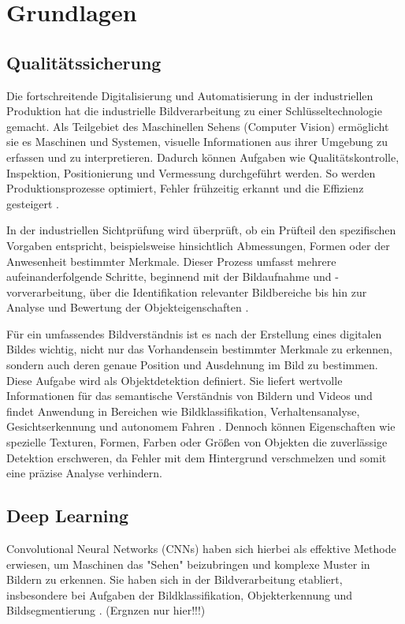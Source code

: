 \section{Grundlagen}

\subsection{Qualitätssicherung}
Die fortschreitende Digitalisierung und Automatisierung in der industriellen Produktion hat die industrielle Bildverarbeitung zu einer Schlüsseltechnologie gemacht. Als Teilgebiet des Maschinellen Sehens (Computer Vision) ermöglicht sie es Maschinen und Systemen, visuelle Informationen aus ihrer Umgebung zu erfassen und zu interpretieren. Dadurch können Aufgaben wie Qualitätskontrolle, Inspektion, Positionierung und Vermessung durchgeführt werden. So werden Produktionsprozesse optimiert, Fehler frühzeitig erkannt und die Effizienz gesteigert \cite{cognex_grundlagen_nodate}.

In der industriellen Sichtprüfung wird überprüft, ob ein Prüfteil den spezifischen Vorgaben entspricht, beispielsweise hinsichtlich Abmessungen, Formen oder der Anwesenheit bestimmter Merkmale. Dieser Prozess umfasst mehrere aufeinanderfolgende Schritte, beginnend mit der Bildaufnahme und -vorverarbeitung, über die Identifikation relevanter Bildbereiche bis hin zur Analyse und Bewertung der Objekteigenschaften \cite[S. 15–16]{demant_industrielle_2011}.

Für ein umfassendes Bildverständnis ist es nach der Erstellung eines digitalen Bildes wichtig, nicht nur das Vorhandensein bestimmter Merkmale zu erkennen, sondern auch deren genaue Position und Ausdehnung im Bild zu bestimmen. Diese Aufgabe wird als Objektdetektion definiert. Sie liefert wertvolle Informationen für das semantische Verständnis von Bildern und Videos und findet Anwendung in Bereichen wie Bildklassifikation, Verhaltensanalyse, Gesichtserkennung und autonomem Fahren \cite{zhao_object_2019}. Dennoch können Eigenschaften wie spezielle Texturen, Formen, Farben oder Größen von Objekten die zuverlässige Detektion erschweren, da Fehler mit dem Hintergrund verschmelzen und somit eine präzise Analyse verhindern.

\subsection{Deep Learning}
Convolutional Neural Networks (CNNs) haben sich hierbei als effektive Methode erwiesen, um Maschinen das "Sehen" beizubringen und komplexe Muster in Bildern zu erkennen. Sie haben sich in der Bildverarbeitung etabliert, insbesondere bei Aufgaben der Bildklassifikation, Objekterkennung und Bildsegmentierung \cite{qi_review_2020}. (Ergnzen nur hier!!!)

